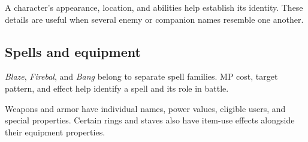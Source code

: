 A character's appearance, location, and abilities help establish its
identity. These details are useful when several enemy or companion names
resemble one another.

\subsection*{Spells and equipment}

\emph{Blaze}, \emph{Firebal}, and \emph{Bang} belong to separate spell
families. MP cost, target pattern, and effect help identify a spell and
its role in battle.

Weapons and armor have individual names, power values, eligible users,
and special properties. Certain rings and staves also have item-use
effects alongside their equipment properties.

